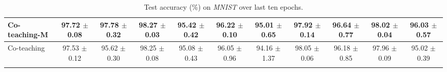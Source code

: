 \documentclass[11pt]{article}
\begin{document}
\begin{table}[!htbp]
\begin{tabular}{l |cc|cc|cc|cc|cc}
			Co-teaching-M & \makecell{97.72\\ $\pm$\scriptsize{0.08}} & \makecell{97.78\\ $\pm$\scriptsize{0.32}} & \makecell{98.27\\ $\pm$\scriptsize{0.03}} & \makecell{95.42\\ $\pm$\scriptsize{0.42}} & \makecell{96.22\\ $\pm$\scriptsize{0.10}} & \makecell{95.01\\ $\pm$\scriptsize{0.65}}&\makecell{97.92\\ $\pm$\scriptsize{0.14}}&\makecell{96.64\\ $\pm$\scriptsize{0.77}}&\makecell{98.02\\ $\pm$\scriptsize{0.04}}&\makecell{96.03\\ $\pm$\scriptsize{0.57}}\\
			\hline
			Co-teaching  & \makecell{97.53\\ $\pm$\scriptsize{0.12}} & \makecell{95.62\\ $\pm$\scriptsize{0.30}} & \makecell{98.25\\ $\pm$\scriptsize{0.08}} & \makecell{95.08\\ $\pm$\scriptsize{0.43}} & \makecell{96.05\\ $\pm$\scriptsize{0.96}} & \makecell{94.16\\ $\pm$\scriptsize{1.37}} & \makecell{98.05\\ $\pm$\scriptsize{0.06}} & \makecell{96.18\\ $\pm$\scriptsize{0.85}} & \makecell{97.96\\ $\pm$\scriptsize{0.09}} & \makecell{95.02\\ $\pm$\scriptsize{0.39}}\\
			
		\Xhline{3\arrayrulewidth}
\end{tabular}
\caption
		{
Test accuracy (\%) on \textit{MNIST} over last ten epochs.
		}
	\label{tab:ablation_mnist}
\end{table}		
\end{document}
